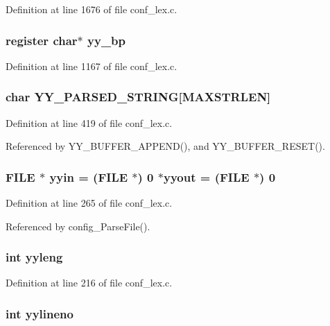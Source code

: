 Definition at line 1676 of file conf\_\-lex.c.
\subsubsection{\setlength{\rightskip}{0pt plus 5cm}register char$\ast$ {\bf yy\_\-bp}}\label{conf__lex_8c_a90}




Definition at line 1167 of file conf\_\-lex.c.
\subsubsection{\setlength{\rightskip}{0pt plus 5cm}char {\bf YY\_\-PARSED\_\-STRING}[MAXSTRLEN]}\label{conf__lex_8c_a89}




Definition at line 419 of file conf\_\-lex.c.

Referenced by YY\_\-BUFFER\_\-APPEND(), and YY\_\-BUFFER\_\-RESET().
\subsubsection{\setlength{\rightskip}{0pt plus 5cm}FILE $\ast$ {\bf yyin} = (FILE $\ast$) 0 $\ast${\bf yyout} = (FILE $\ast$) 0}\label{conf__lex_8c_a65}




Definition at line 265 of file conf\_\-lex.c.

Referenced by config\_\-Parse\-File().
\subsubsection{\setlength{\rightskip}{0pt plus 5cm}int {\bf yyleng}}\label{conf__lex_8c_a64}




Definition at line 216 of file conf\_\-lex.c.
\subsubsection{\setlength{\rightskip}{0pt plus 5cm}int {\bf yylineno}}\label{conf__lex_8c_a87}




